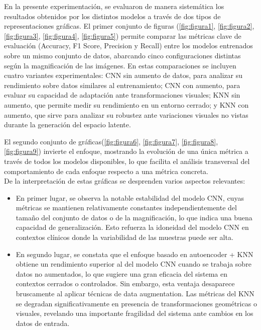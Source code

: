 \documentclass[12pt]{article} %
\begin{document}
\newpage
En la presente experimentación, se evaluaron de manera sistemática los resultados obtenidos por los distintos modelos a través de dos tipos de representaciones gráficas. El primer conjunto de figuras (\ref{fig:figura1}, \ref{fig:figura2}, \ref{fig:figura3}, \ref{fig:figura4}, \ref{fig:figura5}) permite comparar las métricas clave de evaluación (Accuracy, F1 Score, Precision y Recall) entre los modelos entrenados sobre un mismo conjunto de datos, abarcando cinco configuraciones distintas según la magnificación de las imágenes. En estas comparaciones se incluyen cuatro variantes experimentales: CNN sin aumento de datos, para analizar su rendimiento sobre datos similares al entrenamiento; CNN con aumento, para evaluar su capacidad de adaptación ante transformaciones visuales; KNN sin aumento, que permite medir su rendimiento en un entorno cerrado; y KNN con aumento, que sirve para analizar su robustez ante variaciones visuales no vistas durante la generación del espacio latente.

El segundo conjunto de gráficas(\ref{fig:figura6}, \ref{fig:figura7}, \ref{fig:figura8}, \ref{fig:figura9}) invierte el enfoque, mostrando la evolución de una única métrica a través de todos los modelos disponibles, lo que facilita el análisis transversal del comportamiento de cada enfoque respecto a una métrica concreta. \\

De la interpretación de estas gráficas se desprenden varios aspectos relevantes: 

\begin{itemize}
    \item En primer lugar, se observa la notable estabilidad del modelo CNN, cuyas métricas se mantienen relativamente constantes independientemente del tamaño del conjunto de datos o de la magnificación, lo que indica una buena capacidad de generalización. Esto refuerza la idoneidad del modelo CNN en contextos clínicos donde la variabilidad de las muestras puede ser alta.
    \item En segundo lugar, se constata que el enfoque basado en autoencoder + KNN obtiene un rendimiento superior al del modelo CNN cuando se trabaja sobre datos no aumentados, lo que sugiere una gran eficacia del sistema en contextos cerrados o controlados. Sin embargo, esta ventaja desaparece bruscamente al aplicar técnicas de data augmentation. Las métricas del KNN se degradan significativamente en presencia de transformaciones geométricas o visuales, revelando una importante fragilidad del sistema ante cambios en los datos de entrada.
\end{itemize}
\end{document}
